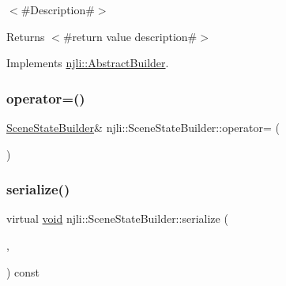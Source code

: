 $<$\#\+Description\#$>$

\begin{DoxyReturn}{Returns}
$<$\#return value description\#$>$ 
\end{DoxyReturn}


Implements \mbox{\hyperlink{classnjli_1_1_abstract_builder_a3e6e553e06d1ca30517ad5fb0bd4d000}{njli\+::\+Abstract\+Builder}}.

\mbox{\label{classnjli_1_1_scene_state_builder_ae8cc4fa5a09cb1ec0973d701b6ed2ed9}} 
\subsubsection{\texorpdfstring{operator=()}{operator=()}}
{\footnotesize\ttfamily \mbox{\hyperlink{classnjli_1_1_scene_state_builder}{Scene\+State\+Builder}}\& njli\+::\+Scene\+State\+Builder\+::operator= (\begin{DoxyParamCaption}\item[{const \mbox{\hyperlink{classnjli_1_1_scene_state_builder}{Scene\+State\+Builder}} \&}]{ }\end{DoxyParamCaption})\hspace{0.3cm}{\ttfamily [protected]}}

\mbox{\label{classnjli_1_1_scene_state_builder_a2aa348d593beb031fedb8012962c40da}} 
\subsubsection{\texorpdfstring{serialize()}{serialize()}}
{\footnotesize\ttfamily virtual \mbox{\hyperlink{_thread_8h_af1e856da2e658414cb2456cb6f7ebc66}{void}} njli\+::\+Scene\+State\+Builder\+::serialize (\begin{DoxyParamCaption}\item[{\mbox{\hyperlink{_thread_8h_af1e856da2e658414cb2456cb6f7ebc66}{void}} $\ast$}]{,  }\item[{bt\+Serializer $\ast$}]{ }\end{DoxyParamCaption}) const\hspace{0.3cm}{\ttfamily [virtual]}}

